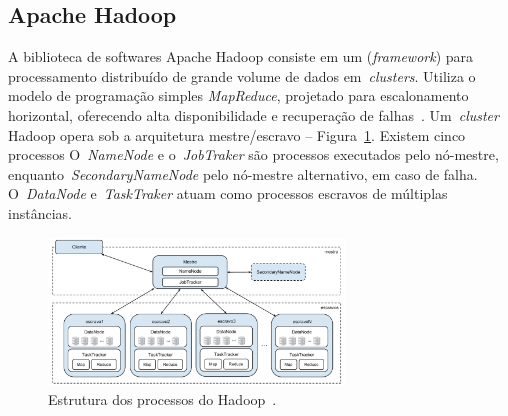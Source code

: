 \documentclass[12pt]{article}
\begin{document}
\subsection{Apache Hadoop}
\label{subsection:hadoop}

A biblioteca de softwares Apache Hadoop consiste em um (\textit{framework}) para processamento distribuído de grande volume de dados em~\emph{clusters}. Utiliza o modelo de programação simples \emph{MapReduce}, projetado para escalonamento horizontal, oferecendo alta disponibilidade e recuperação de falhas~\cite{hadoophbase}. Um~\emph{cluster} Hadoop opera sob a arquitetura mestre/escravo -- Figura~\ref{figure:hadoop}. Existem cinco processos O~\emph{NameNode} e o~\emph{JobTraker} são processos executados pelo nó-mestre, enquanto~\emph{SecondaryNameNode} pelo nó-mestre alternativo, em caso de falha. O~\emph{DataNode} e~\emph{TaskTraker} atuam como processos escravos de múltiplas instâncias. %

\begin{figure}[!ht]
\centering
\includegraphics[width=0.7\textwidth]{images/hadoop.png}
\caption{Estrutura dos processos do Hadoop~\cite{goldman2012apache}.}
\label{figure:hadoop}
\end{figure}


\end{document}
